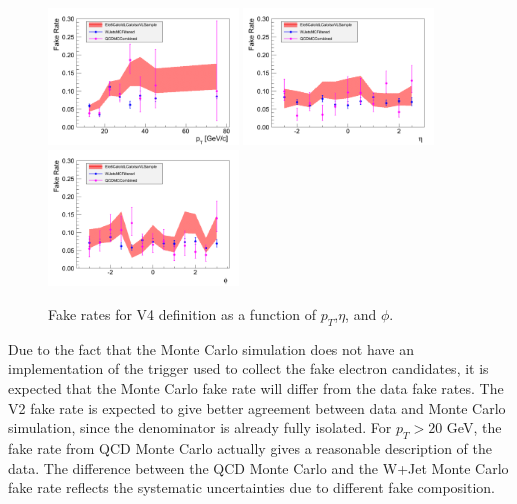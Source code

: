 \begin{figure}[!htbp]
\begin{center}
\includegraphics[width=0.45\textwidth]{figures/ElectronFakeRate_DenominatorV4_ptThreshold30_Pt.pdf}
\includegraphics[width=0.45\textwidth]{figures/ElectronFakeRate_DenominatorV4_ptThreshold30_Eta.pdf}
\includegraphics[width=0.45\textwidth]{figures/ElectronFakeRate_DenominatorV4_ptThreshold30_Phi.pdf}
\caption{Fake rates for V4 definition as a function of $p_T$,$\eta$, and $\phi$.}
\label{fig:ele_fr_V4_jet30}
\end{center}
\end{figure}

Due to the fact that the Monte Carlo simulation does not have an implementation of the trigger used
to collect the fake electron candidates, it is expected that the Monte Carlo fake rate will differ
from the data fake rates. The V2 fake rate is expected to give better agreement between data and 
Monte Carlo simulation, since the denominator is already fully isolated. For $p_{T} > 20$ GeV, 
the fake rate from QCD Monte Carlo actually gives a reasonable description of the data. The difference
between the QCD Monte Carlo and the W+Jet Monte Carlo fake rate reflects the systematic uncertainties
due to different fake composition.


